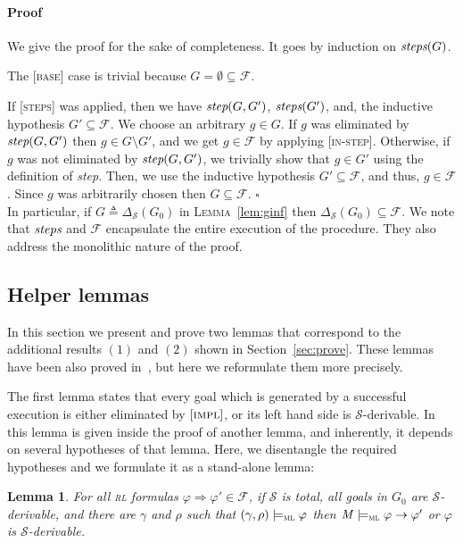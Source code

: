 \documentclass[conference]{IEEEtran}
\newenvironment{todo}{\medskip\hrule\smallskip\noindent}{\smallskip\hrule\medskip}
\newcommand{\vr}[1]{\begin{todo}\textcolor{blue}{Vlad:}\\ \color{orange}{#1}\color{black}\end{todo}}
\newcommand{\vr}[1]{}
\newcommand{\M}{\mathit{M}}
\newcommand{\eqbydef}{\triangleq}
\newcommand{\F}{\mathcal{F}}
\renewcommand{\S}{\mathcal{S}}
\newcommand{\Ra}{\Rightarrow}
\renewcommand{\implies}{\rightarrow}
\newcommand{\ML}{\textsc{ml}\xspace}
\newcommand{\RL}{\textsc{rl}\xspace}
\newcommand{\rrule}[2]{{#1} \Ra{#2}}
\newcommand{\modelsml}{\models_\ML}
\newcommand{\coq}[1]{{\small \textit{#1}}}
\newtheorem{lemma}{Lemma}
\begin{document}
\paragraph{Proof}
We give the proof for the sake of completeness.
It goes by induction on $\coq{steps}(G)$. 

The [\textsc{base}] case is trivial  because $G = \emptyset \subseteq \F$.

If [\textsc{steps}] was applied, then we have $\coq{step}(G, G')$, $\coq{steps}(G')$, and, the inductive hypothesis $G' \subseteq \F$.
We choose an arbitrary $g \in G$.
If $g$ was eliminated by $\coq{step}(G, G')$ then $g \in G \setminus G'$, and we get $g \in \F$ by applying [\textsc{in-step}].
Otherwise, if $g$ was not eliminated by $\coq{step}(G, G')$, we trivially show that $g \in G'$ using the definition of \coq{step}.
Then, we use the inductive hypothesis $G' \subseteq \F$, and thus, $g \in \F$.
Since $g$ was arbitrarily chosen then $G \subseteq \F$. $\square$\\


In particular, if $G \eqbydef\Delta_\S(G_0)$ in \textsc{Lemma}~\ref{lem:ginf} then $\Delta_\S(G_0) \subseteq \F$.
We note that $\coq{steps}$ and $\F$ encapsulate the entire execution of the procedure. 
They also address the monolithic nature of the proof.


\subsection{Helper lemmas}
\label{sec:hl}
In this section we present and prove two  lemmas that correspond to the additional results $(1)$ and $(2)$ shown in Section~\ref{sec:prove}.
These lemmas have been also proved in~\cite{lucanu-rusu-arusoaie-nowak-LRC2015}, but here we reformulate them more precisely.

The first lemma states that every goal which is generated by a successful execution is either eliminated by $[\textsc{impl}]$, or its left hand side is $\S$-derivable.
In~\cite{lucanu-rusu-arusoaie-nowak-LRC2015} this lemma is given inside the proof of another lemma, and inherently, it depends on several hypotheses of that lemma.
Here, we disentangle the required hypotheses and we formulate it as a stand-alone lemma:
\begin{lemma}
\label{lem:impl_or_der}
For all \RL formulas $\rrule{\varphi}{\varphi'} \in \F$, if $\S$ is total, all goals in $G_0$ are $\S$-derivable, and there are $\gamma$ and $\rho$ such that $(\gamma, \rho)\modelsml \varphi$ then 
$\M \modelsml \varphi \implies \varphi'$ or $\varphi$ is $\S$-derivable.
\end{lemma}
\end{document}
